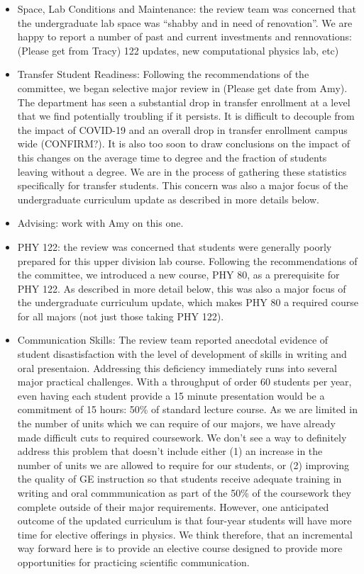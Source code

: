 \documentclass[12pt]{article}
\begin{document}
\begin{itemize}
\item Space, Lab Conditions and Maintenance:  the review team was concerned that the undergraduate lab space was ``shabby and in need of renovation''.  We are happy to report a number of past and current investments and rennovations:  (Please get from Tracy)
122 updates, new computational physics lab, etc)

\item Transfer Student Readiness: Following the recommendations of the
  committee, we began selective major review in (Please get date from
  Amy).  The department has seen a substantial drop in transfer
  enrollment at a level that we find potentially troubling if it
  persists.  It is difficult to decouple from the impact of COVID-19
  and an overall drop in transfer enrollment campus wide (CONFIRM?).
  It is also too soon to draw conclusions on the impact of this
  changes on the average time to degree and the fraction of students
  leaving without a degree.  We are in the process of gathering these
  statistics specifically for transfer students.  This concern was
  also a major focus of the undergraduate curriculum update as
  described in more details below.

\item Advising:  work with Amy on this one.

\item PHY 122: the review was concerned that students were generally
  poorly prepared for this upper division lab course.  Following the
  recommendations of the committee, we introduced a new course, PHY
  80, as a prerequisite for PHY 122.  As described in more detail
  below, this was also a major focus of the undergraduate curriculum
  update, which makes PHY 80 a required course for all majors (not
  just those taking PHY 122).

\item Communication Skills: The review team reported anecdotal
  evidence of student disastisfaction with the level of development of
  skills in writing and oral presentaion.  Addressing this deficiency
  immediately runs into several major practical challenges.  With a
  throughput of order 60 students per year, even having each student
  provide a 15 minute presentation would be a commitment of 15 hours:
  50\% of standard lecture course.  As we are limited in the number of
  units which we can require of our majors, we have already made
  difficult cuts to required coursework.  We don't see a way to
  definitely address this problem that doesn't include either (1) an
  increase in the number of units we are allowed to require for our
  students, or (2) improving the quality of GE instruction so that
  students receive adequate training in writing and oral
  commmunication as part of the 50\% of the coursework they complete
  outside of their major requirements.  However, one anticipated
  outcome of the updated curriculum is that four-year students will
  have more time for elective offerings in physics.  We think
  therefore, that an incremental way forward here is to provide an
  elective course designed to provide more opportunities for
  practicing scientific communication.


\end{itemize}
\end{document}
